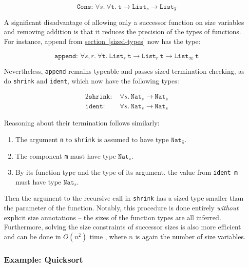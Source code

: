\documentclass{article}
\begin{document}
$$\texttt{Cons: } \forall s.\ \forall \texttt{t}.\ \texttt{t} \rightarrow \texttt{List}_s \rightarrow \texttt{List}_{\hat{s}}$$

A significant disadvantage of allowing only a successor function on size variables and removing addition is that it reduces the precision of the types of functions. For instance, append from \hyperlink{append}{section~\ref*{sized-types}} now has the type:

$$\texttt{append: } \forall s, r.\ \forall \texttt{t}.\ \texttt{List}_s\ \texttt{t} \rightarrow \texttt{List}_{r}\ \texttt{t} \rightarrow \texttt{List}_\infty\ \texttt{t}$$

Nevertheless, \texttt{append} remains typeable and passes sized termination checking, as do \texttt{shrink} and \texttt{ident}, which now have the following types:

\begin{alignat*}{2}
    \texttt{shrink: } &\forall s.\ \texttt{Nat}_s \rightarrow \texttt{Nat}_s\\
    \texttt{ident: }  &\forall s.\ \texttt{Nat}_s \rightarrow \texttt{Nat}_s
\end{alignat*}

Reasoning about their termination follows similarly:

\begin{enumerate}
    \item The argument \texttt{n} to \texttt{shrink} is assumed to have type $\texttt{Nat}_{\hat{s}}$.
    \item The component \texttt{m} must have type $\texttt{Nat}_s$.
    \item By its function type and the type of its argument, the value from \texttt{ident m} must have type $\texttt{Nat}_s$.
\end{enumerate}

Then the argument to the recursive call in \texttt{shrink} has a sized type smaller than the parameter of the function. Notably, this procedure is done entirely \textit{without} explicit size annotations -- the sizes of the function types are all inferred. Furthermore, solving the size constraints of successor sizes is also more efficient and can be done in $O(n^2)$ time \cite{f-hat}, where $n$ is again the number of size variables.

\subsubsection{Example: Quicksort}
\end{document}

